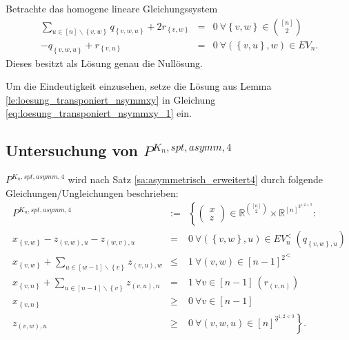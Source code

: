 \documentclass[10p,a4paper,BCOR = 12mm, DIV=15]{scrbook}
\begin{document}
{\begin{Kor}
\label{kor:loesung_transponiert_nsymmxy}
Betrachte das homogene lineare Gleichungssystem
\begin{eqnarray}
\sum_{u\in[n]\backslash\left\{v, w\right\}} q_{\left\{v, w, u\right\}} + 2 r_{\left\{v, w\right\}} & = & 0 \ \forall \left\{v, w\right\}\in {[n] \choose 2} \label{eq:loesung_transponiert_nsymmxy_1} \\
-q_{\left\{v, w, u\right\}} + r_{\left\{v, u\right\}} & = &  0\ \forall \left(\left\{v, u\right\}, w\right)\in EV_n. \nonumber
\end{eqnarray}
Dieses besitzt als Lösung genau die Nullösung.
\end{Kor}
\begin{bew}
Um die Eindeutigkeit einzusehen, setze die Lösung aus Lemma \ref{le:loesung_transponiert_nsymmxy} in Gleichung \eqref{eq:loesung_transponiert_nsymmxy_1} ein.
\end{bew}

\subsection{Untersuchung von $P^{K_n, spt, asymm, 4}$}

\label{sec:untersuchung_Pnasymm4}

$P^{K_n, spt, asymm, 4}$ wird nach Satz \ref{sa:asymmetrisch_erweitert4} durch folgende Gleichungen/Ungleichungen beschrieben:
\begin{eqnarray}
P^{K_n, spt, asymm, 4} & := & \left\{
\left(\begin{array}{c}
x \\
z
\end{array}\right)\in \mathbb{R}^{[n]\choose 2} \times \mathbb{R}^{\left[n\right]^{\underline{3}^{1, 2<3}}}: \nonumber\right. \nonumber \\
x_{\left\{v, w\right\}} - z_{\left(v, w\right), u} - z_{\left(w, v\right), u} & = & 0\ \forall \left(\left\{v, w\right\}, u\right)\in EV_n^< \ \left(q_{\left\{v, w\right\}, u}\right) \nonumber \\
x_{\left\{v, w\right\}} + \sum_{u\in[w-1]\backslash\left\{v\right\}} z_{\left(v, u\right), w} & \leq & 1\ \forall \left(v, w\right)\in {[n-1]^{\underline{2}}}^<  \label{eq:to_check_strict} \\
x_{\left\{v, n\right\}} + \sum_{u\in[n-1]\backslash\left\{v\right\}} z_{\left(v, u\right), n} & = & 1\ \forall v\in [n-1] \ \left(r_{\left(v, n\right)}\right) \nonumber \\
x_{\left\{v, n\right\}} & \geq & 0 \ \forall v\in \left[n-1\right] \nonumber \\
z_{\left(v, w\right), u} & \geq & \left. 0 \ \forall \left(v, w, u\right)\in \left[n\right]^{\underline{3}^{1, 2<3}} \right\}. \nonumber
\end{eqnarray}

}
\end{document}
